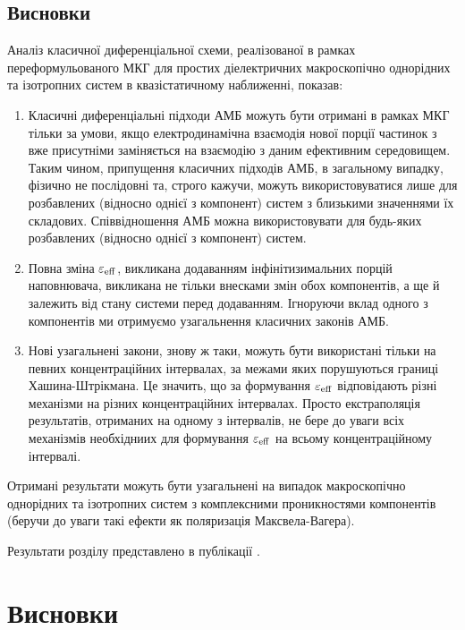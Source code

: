 \documentclass[14pt,twoside]{vakthesis}
\begin{document}
\section{Висновки}
Аналіз класичної диференціальної схеми, реалізованої в рамках переформульованого МКГ для простих діелектричних макроскопічно однорідних та ізотропних систем в квазістатичному наближенні, показав:
\begin{enumerate}
	\item 
	Класичні диференціальні підходи АМБ можуть бути отримані в рамках МКГ тільки за умови, якщо електродинамічна взаємодія нової порції частинок з вже присутніми заміняється на взаємодію з даним ефективним середовищем. Таким чином, припущення класичних підходів АМБ, в загальному випадку, фізично не послідовні та, строго кажучи, можуть використовуватися лише для розбавлених (відносно однієї з компонент) систем з близькими значеннями їх складових. Співвідношення АМБ можна використовувати для будь-яких розбавлених (відносно однієї з компонент) систем. 
	\item 
	Повна зміна $\varepsilon_{\rm eff}$, викликана додаванням
	інфінітизимальних порцій наповнювача, викликана не тільки внесками змін обох компонентів, а ще й залежить від стану системи перед додаванням. Ігноруючи вклад
	одного з компонентів ми отримуємо узагальнення класичних
	законів АМБ.
	\item 
	Нові узагальнені закони, знову ж таки, можуть бути використані
	тільки на певних концентраційних інтервалах, за межами яких
	порушуються границі Хашина-Штрікмана. Це значить, що за
	формування $\varepsilon_{\rm eff}$ відповідають різні механізми
	на різних концентраційних інтервалах. Просто екстраполяція
	результатів, отриманих на одному з інтервалів, не бере до уваги
	всіх механізмів необхідниих для формування $\varepsilon_{\rm eff}$
	на всьому концентраційному інтервалі.
\end{enumerate}
Отримані результати можуть бути узагальнені на випадок макроскопічно однорідних та ізотропних систем з комплексними проникностями компонентів (беручи до уваги такі ефекти як поляризація Максвела-Вагера).

Результати розділу представлено в публікації \cite{Semenov2018}.


\chapter*{Висновки}
\end{document}
